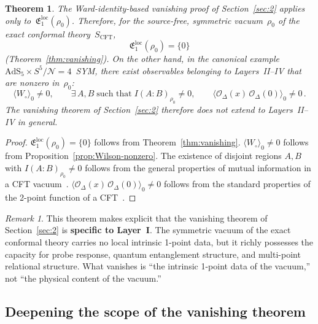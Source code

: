 \documentclass[
  aps,
  prd,
  preprint,
  groupedaddress,
  nofootinbib,
  longbibliography
]{revtex4-2}
\newtheorem{theorem}[definition]{Theorem}
\theoremstyle{remark}
\newtheorem{remark}[definition]{Remark}
\newcommand{\N}{\mathcal{N}}
\newcommand{\AdS}{\mathrm{AdS}}
\begin{document}
\begin{theorem}\label{thm:scope}
The Ward-identity-based vanishing proof of Section~\ref{sec:2}
applies only to~$\mathfrak{E}_1^{\mathrm{loc}}(\rho_0)$.
Therefore, for the source-free, symmetric vacuum~$\rho_0$
of the exact conformal
theory~$S_{\mathrm{CFT}}$,
\begin{equation}\label{eq:layer-I-vanish}
  \mathfrak{E}_1^{\mathrm{loc}}(\rho_0) = \{0\}
\end{equation}
(Theorem~\ref{thm:vanishing}).
On the other hand, in the canonical
example~$\AdS_5\times S^5/\N=4$~SYM, there exist observables
belonging to Layers~II--IV that are nonzero in~$\rho_0$:
\begin{equation}\label{eq:layers-nonzero}
  \langle W_\circ\rangle_0 \neq 0,\qquad
  \exists\,A,B\;\text{such that}\;
    I(A:B)_{\rho_0}\neq 0,\qquad
  \langle\mathcal{O}_\Delta(x)\,
    \mathcal{O}_\Delta(0)\rangle_0\neq 0\,.
\end{equation}
The vanishing theorem of Section~\ref{sec:2} therefore does not
extend to Layers~II--IV in general.
\end{theorem}

\begin{proof}
$\mathfrak{E}_1^{\mathrm{loc}}(\rho_0)=\{0\}$ follows from
Theorem~\ref{thm:vanishing}.
$\langle W_\circ\rangle_0\neq 0$ follows from
Proposition~\ref{prop:Wilson-nonzero}.
The existence of disjoint regions $A,B$ with
$I(A:B)_{\rho_0}\neq 0$ follows from the general properties
of mutual information in a CFT
vacuum~\cite{ref32,ref33}.
$\langle\mathcal{O}_\Delta(x)\,
\mathcal{O}_\Delta(0)\rangle_0\neq 0$ follows from the standard
properties of the 2-point function of a
CFT~\cite{ref5,ref13,ref14}.
\end{proof}

\begin{remark}\label{rem:scope-layer-specific}
This theorem makes explicit that the vanishing theorem of
Section~\ref{sec:2} is \textbf{specific to Layer~I}.
The symmetric vacuum of the exact conformal theory carries no
local intrinsic 1-point data, but it richly possesses the
capacity for probe response, quantum entanglement structure, and
multi-point relational structure.
What vanishes is ``the intrinsic 1-point data of the vacuum,''
not ``the physical content of the vacuum.''
\end{remark}

\subsection{Deepening the scope of the vanishing
  theorem}\label{subsec:6-7}
\end{document}
